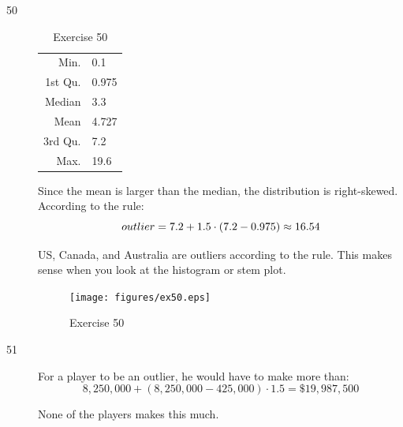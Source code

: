 \documentclass[letterpaper, landscape]{exam}
\begin{document}
\begin{description}


      \item[50]
        \begin{table}[H]
          \centering
          \begin{tabular}{rl}
            \toprule
            Min.    & 0.1 \\
            1st Qu. & 0.975 \\
            Median  & 3.3 \\
            Mean    & 4.727 \\
            3rd Qu. & 7.2 \\
            Max.    & 19.6 \\
            \bottomrule
          \end{tabular}
          \caption{Exercise 50}
        \end{table}

        Since the mean is larger than the median, the distribution is right-skewed.
        According to the rule:
        \[
          outlier = 7.2 + 1.5 \cdot (7.2 - 0.975) \approx 16.54 \\
        \]

        US, Canada, and Australia are outliers according to the rule.  This
        makes sense when you look at the histogram or stem plot.

        \begin{figure}[H]
          \centering
          \texttt{[image: figures/ex50.eps]}
          \caption{Exercise 50}
        \end{figure}

      \item[51] 
        For a player to be an outlier, he would have to make more than:
        \[
          8,250,000 + (8,250,000 - 425,000) \cdot 1.5 = \$19,987,500
        \]

        None of the players makes this much.

    \end{description}
\end{document}
